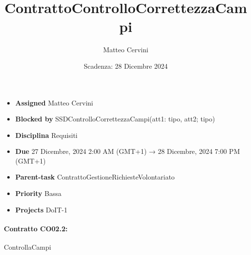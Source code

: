 \title{ContrattoControlloCorrettezzaCampi}
\author{Matteo Cervini}
\date{Scadenza: 28 Dicembre 2024}

\maketitle

\noindent
\begin{itemize}
  \item \textbf{Assigned} Matteo Cervini
  \item \textbf{Blocked by} SSDControlloCorrettezzaCampi(att1: tipo, att2; tipo)
  \item \textbf{Disciplina} Requisiti
  \item \textbf{Due} 27 Dicembre, 2024 2:00 AM (GMT+1) → 28 Dicembre, 2024 7:00 PM (GMT+1)
  \item \textbf{Parent-task} ContrattoGestioneRichiesteVolontariato
  \item \textbf{Priority} Bassa
  \item \textbf{Projects} DoIT-1
\end{itemize}

\vspace{0.5cm}

\noindent
\paragraph{Contratto \textbf{CO02.2}:} ControllaCampi

